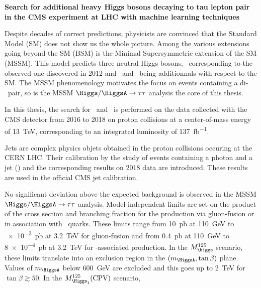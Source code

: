 \begin{center}
\LARGE
\bf
\sffamily
Search for additional heavy Higgs bosons decaying to tau lepton pair in the CMS experiment at LHC with machine learning techniques
\end{center}

\vspace{2\baselineskip}

Despite decades of correct predictions,
physicists are convinced that the Standard Model (SM) does not show us the whole picture.
Among the various extensions going beyond the SM (BSM)
is the
Minimal Supersymmetric extension of the SM (MSSM).
This model predicts
three neutral Higgs bosons,
\higgs\ corresponding to the observed one discovered in 2012
and
\Higgs\ and \HiggsA\ being additionnals with respect to the SM.
The MSSM phenomenology motivates the focus on events containing a di-\tau\ pair,
so is the MSSM $\Higgs/\HiggsA\to\tau\tau$ analysis the core of this thesis.
\par
In this thesis,
the search
for \Higgs\ and \HiggsA\ 
is performed
on the data collected
with the CMS detector from 2016 to 2018
on proton collisions
at a center-of-mass energy of \SI{13}{\TeV},
corresponding to an integrated luminosity of \SI{137}{\femto\barn^{-1}}.
\par
Jets are complex physics objets
obtained
in the proton collisions occuring at the CERN LHC.
Their calibration by
the study of events containing a photon and a jet (\Gjet)
and the corresponding results on 2018 data
are introduced.
These results %
are used in the official CMS jet calibration.
\par
No significant deviation above the expected background is observed in the MSSM $\Higgs/\HiggsA\to\tau\tau$ analysis.
Model-independent limits are set
on the product of the cross section and branching fraction
for the production
via gluon-fusion
or
in association with \quarkb~quarks.
These limits range
from
\SI{10}{\pico\barn} at \SI{110}{\GeV}
to
\SI{e-3}{\pico\barn} at \SI{3.2}{\TeV}
for gluon-fusion
and from
\SI{0.4}{\pico\barn} at \SI{110}{\GeV}
to
\SI{8e-4}{\pico\barn} at \SI{3.2}{\TeV}
for \quarkb-associated production.
In the $M_{\higgs}^{125}$ scenario,
these limits translate into
an exclusion region in the $(m_{\HiggsA},\tan\beta)$ plane.
Values of $m_{\HiggsA}$ below \SI{600}{\GeV} are excluded
and this goes up to 
\SI{2}{\TeV} for $\tan\beta\gtrsim\num{50}$.
In the $M_{\Higgs_1}^{125}(\text{CPV})$ scenario,
